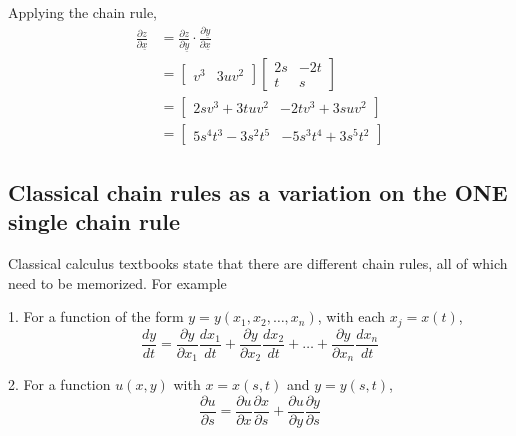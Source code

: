    Applying the chain rule, 
   \begin{align*}
      \frac{\partial z}{\partial \underline{x}} &= \frac{\partial z}{\partial \underline{y}} \cdot \frac{\partial  \underline{y}}{\partial \underline{x}} \\
                                                &= \begin{bmatrix} 
                                                   v^3 & 3uv^2  
                                                \end{bmatrix} \begin{bmatrix} 
                                                   2s & -2t \\ t & s   
                                                \end{bmatrix} \\
                                                &= \begin{bmatrix} 
                                                   2sv^3 + 3tuv^2 & -2tv^3 + 3suv^2  
                                                \end{bmatrix} \\
                                                &= \begin{bmatrix} 
                                                   5s^4 t^3 - 3s^2t^5 & -5s^3t^4 + 3s^5t^2  
                                                \end{bmatrix}
   \end{align*}

   \subsection{Classical chain rules as a variation on the ONE single chain rule}
   \begin{framed}
      Classical calculus textbooks state that there are different chain rules, all of which need to be memorized. For example

      1. For a function of the form $y = y(x_1, x_2, \hdots, x_n)$, with each $x_j = x(t)$,  \[
        \frac{dy}{dt} = \frac{\partial y}{\partial x_1} \frac{dx_1}{dt} + \frac{\partial y}{\partial x_2} \frac{d x_2}{dt} + \hdots + \frac{\partial y}{\partial x_n} \frac{d x_n}{dt}
      \] 

      2. For a function $u(x, y)$ with $x = x(s, t)$ and $y = y(s, t)$, 
      \[
        \frac{\partial u}{\partial s} = \frac{\partial u}{\partial x} \frac{\partial x}{\partial s} + \frac{\partial u}{\partial y} \frac{\partial y}{\partial s}
      \] 
   \end{framed}

